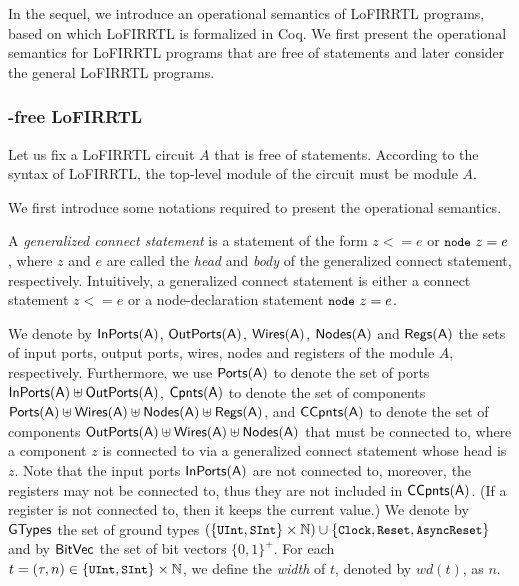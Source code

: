 
In the sequel, we introduce an operational semantics of LoFIRRTL programs,
based on which LoFIRRTL is formalized in Coq.
We first present the operational semantics for LoFIRRTL programs that are free of  statements
and later consider the general LoFIRRTL programs.



\subsubsection{\protect{}-free LoFIRRTL}
Let us fix a LoFIRRTL circuit $A$ that is free of  statements. According to the syntax of LoFIRRTL, the top-level module of the circuit must be module $A$.

We first introduce some notations required to present the operational semantics.


A \emph{generalized connect statement} is a statement of the form $z <= e$ or $\mbox{\tt \prettyll{node}}\ z = e$, where $z$ and $e$ are called the \emph{head} and \emph{body} of the generalized connect statement, respectively. Intuitively, a generalized connect statement is either a connect statement $z <= e$ or a node-declaration statement $\mbox{\tt \prettyll{node}}\ z = e$.


We denote by $\sf InPorts(A)$, $\sf OutPorts(A)$, $\sf Wires(A)$, $\sf Nodes(A)$
and $\sf Regs(A)$ the sets of input ports, output ports, wires, nodes and registers of the module $A$, respectively.
Furthermore, we use $\sf Ports(A)$ to denote the set of ports $\sf InPorts(A) \uplus \sf OutPorts(A)$,
$\sf Cpnts(A)$ to denote the set of components $\sf Ports(A) \uplus \sf Wires(A) \uplus \sf Nodes(A) \uplus \sf Regs(A)$,
and $\sf CCpnts(A)$ to denote the set of components $\sf OutPorts(A) \uplus \sf Wires(A) \uplus \sf Nodes(A)$ that must be connected to, %
where a component $z$ is connected to via a generalized connect statement whose head is $z$.
Note that the input ports $\sf InPorts(A)$ are not connected to, moreover, the registers may not be connected to, thus they
are not included in $\sf CCpnts(A)$. (If a register is not connected to, then it keeps the current value.)
We denote by $\sf GTypes$  the set of ground types $(\{\mbox{\prettyll{UInt}}, \mbox{\prettyll{SInt}}\} \times \Nat) \cup \{\mbox{\prettyll{Clock}},
\mbox{\prettyll{Reset}}, \mbox{\prettyll{AsyncReset}}\}$ and by $\sf BitVec$ the set of bit vectors $\{0,1\}^+$.
For each $t = (\tau, n) \in \{\mbox{\prettyll{UInt}}, \mbox{\prettyll{SInt}}\} \times \Nat$, we define the \emph{width} of $t$, denoted by $wd(t)$, as $n$.


